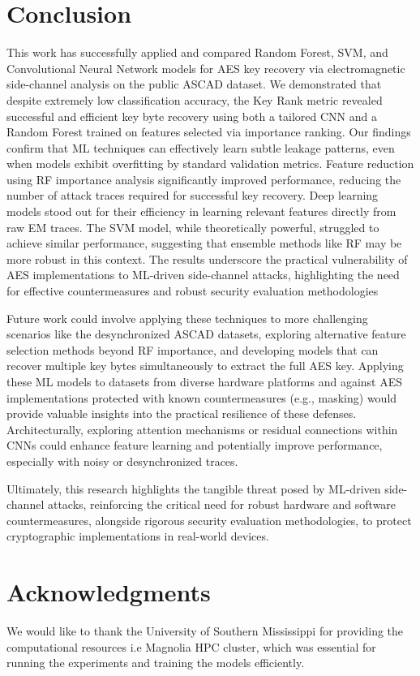 \documentclass[runningheads]{llncs}
\begin{document}
\section{Conclusion}
This work has successfully applied and compared Random Forest, SVM, and Convolutional Neural Network models for AES key recovery via electromagnetic side-channel analysis on the public ASCAD dataset. We demonstrated that despite extremely low classification accuracy, the Key Rank metric revealed successful and efficient key byte recovery using both a tailored CNN and a Random Forest trained on features selected via importance ranking. Our findings confirm that ML techniques can effectively learn subtle leakage patterns, even when models exhibit overfitting by standard validation metrics. Feature reduction using RF importance analysis significantly improved performance, reducing the number of attack traces required for successful key recovery. Deep learning models stood out for their efficiency in learning relevant features directly from raw EM traces. The SVM model, while theoretically powerful, struggled to achieve similar performance, suggesting that ensemble methods like RF may be more robust in this context. The results underscore the practical vulnerability of AES implementations to ML-driven side-channel attacks, highlighting the need for effective countermeasures and robust security evaluation methodologies 

Future work could involve applying these techniques to more challenging scenarios like the desynchronized ASCAD datasets, exploring alternative feature selection methods beyond RF importance, and developing models that can recover multiple key bytes simultaneously to extract the full AES key.\cite{berreby2023investigating} Applying these ML models to datasets from diverse hardware platforms and against AES implementations protected with known countermeasures (e.g., masking) would provide valuable insights into the practical resilience of these defenses. Architecturally, exploring attention mechanisms or residual connections within CNNs could enhance feature learning and potentially improve performance, especially with noisy or desynchronized traces. 

Ultimately, this research highlights the tangible threat posed by ML-driven side-channel attacks, reinforcing the critical need for robust hardware and software countermeasures, alongside rigorous security evaluation methodologies, to protect cryptographic implementations in real-world devices.

\section*{Acknowledgments}
We would like to thank the University of Southern Mississippi for providing the computational resources i.e Magnolia HPC cluster, which was essential for running the experiments and training the models efficiently. 



\end{document}
